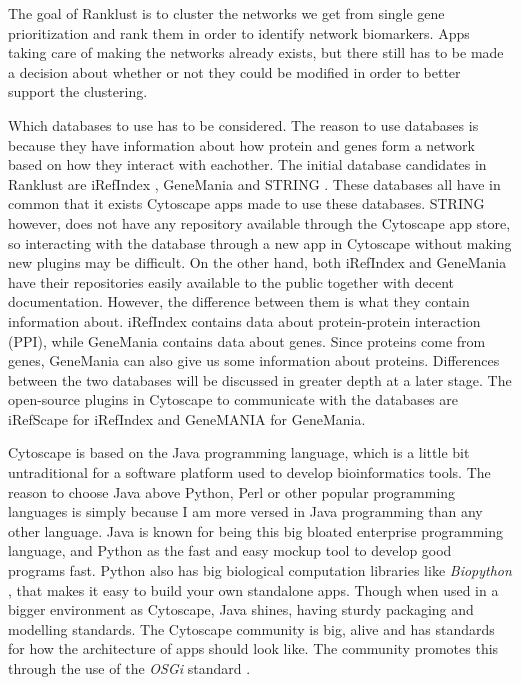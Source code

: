 \documentclass[UKenglish,11pt,a4paper]{article}
\begin{document}
The goal of Ranklust is to cluster the networks we get from single gene prioritization and rank them in order to 
identify network biomarkers. Apps taking care of making the networks already exists, but there still has to be made a 
decision about whether or not they could be modified in order to better support the clustering.

Which databases to use has to be considered. The reason to use databases is because they have information about how 
protein and genes form a network based on how they interact with eachother. The initial database candidates in Ranklust 
are iRefIndex \cite{iri}, GeneMania \cite{gm} and STRING \cite{str}. These databases all have in common that it exists
Cytoscape apps made to use these databases. STRING however, does not have any repository available through the Cytoscape
app store, so interacting with the database through a new app in Cytoscape without making new plugins may be difficult.
On the other hand, both iRefIndex and GeneMania have their repositories easily available to the public together with
decent documentation. However, the difference between them is what they contain information about. iRefIndex contains
data about protein-protein interaction (PPI), while GeneMania contains data about genes.
Since proteins come from genes, GeneMania can also give us some information about proteins. Differences between the
two databases will be discussed in greater depth at a later stage.
The open-source plugins in Cytoscape to communicate with the databases are iRefScape \cite{iridb} for iRefIndex and 
GeneMANIA \cite{gmdb} for GeneMania.

Cytoscape is based on the Java programming language, which is a little bit untraditional for a software platform used to
develop bioinformatics tools. %
The reason to choose Java above Python, Perl or other popular programming languages is simply because I am more
versed in Java programming than any other language. Java is known for being this big bloated 
enterprise programming language, and Python as the fast and easy mockup tool to develop good programs fast. Python also
has big biological computation libraries like \emph{Biopython} \cite{biopython}, that makes it easy to build your own
standalone apps. Though when used in a bigger environment as Cytoscape, Java shines, having sturdy packaging and
modelling standards. The Cytoscape community is big, alive and has standards for how the architecture of apps should
look like. The community promotes this through the use of the \emph{OSGi} standard \cite{cytoscape-osgi}.
\end{document}
